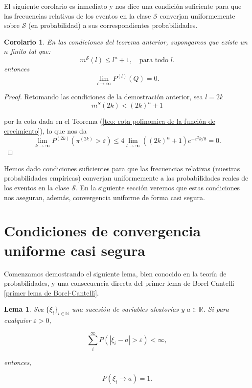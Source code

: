 \documentclass{report}
\newtheorem{lem}{Lema}[section]
\newtheorem{cor}{Corolario}[thm]
\begin{document}
El siguiente corolario es inmediato y nos dice una condición suficiente para que las frecuencias relativas de
los eventos en la clase \( \mathcal{S} \) converjan uniformemente sobre \( \mathcal{S} \) (en probabilidad) a sus
correspondientes probabilidades.

\begin{cor}
En las condiciones del teorema anterior, supongamos que existe un $n$ finito tal que:
\[
m^{\mathcal{S}}(l) \leq l^n + 1, \quad \text{para todo } l.
\]
entonces
\[
\lim_{l\to\infty} P^{(l)}\left(Q\right)= 0.
\]
\end{cor}

\begin{proof}

Retomando las condiciones de la demostración anterior, sea $l=2k$
\[
m^S(2k)<(2k)^n + 1
\]

por la cota dada en el Teorema (\ref{teo: cota polinomica de la función de crecimiento}), lo que nos da
\[
\lim_{k\to\infty} P^{(2k)}\left(\pi^{(2k)}>\varepsilon\right) \leq 4 \lim_{l\to\infty} ((2k)^n+1) e^{-\varepsilon^2 k / 8} = 0.
\]
\end{proof}


\bigskip
Hemos dado condiciones suficientes para que las frecuencias relativas (nuestras probabilidades empíricas) converjan uniformemente a las
probabilidades reales de los eventos en la clase \( \mathcal{S} \). En la siguiente sección veremos que estas condiciones nos aseguran, además,
convergencia uniforme de forma casi segura.

\section{Condiciones de convergencia uniforme casi segura}

Comenzamos demostrando el siguiente lema, bien conocido en la teoría de probabilidades, y una consecuencia directa del primer lema de Borel Cantelli \ref{primer lema de Borel-Cantelli}.

\begin{lem}\label{Aplicacion del lema de Borel-Cantelli}
    Sea $\{\xi_i\}_{i\in\mathbb{N}}$ una sucesión de variables aleatorias y $a\in\mathbb{R}$. Si para cualquier \( \varepsilon > 0 \),

    \[
    \sum_{i}^{\infty} P(|\xi_i - a| > \varepsilon) < \infty,
    \]

    entonces,

    \[
    P(\xi_i \to a) = 1.
    \]
\end{lem}
\end{document}

